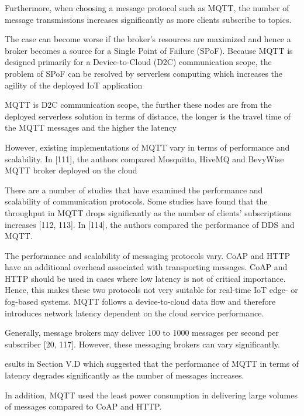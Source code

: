 Furthermore, when choosing a message protocol such as
MQTT, the number of message transmissions increases
significantly as more clients subscribe to topics.
\cite[19]{protocols}

The case
can become worse if the broker’s resources are maximized
and hence a broker becomes a source for a Single Point of
Failure (SPoF). Because MQTT is designed primarily for a
Device-to-Cloud (D2C) communication scope, the problem
of SPoF can be resolved by serverless computing which
increases the agility of the deployed IoT application
\cite[19]{protocols}


MQTT is D2C communication scope, the
further these nodes are from the deployed serverless solution
in terms of distance, the longer is the travel time of the MQTT
messages and the higher the latency \cite[20]{protocols}

However, existing implementations of MQTT vary in
terms of performance and scalability. In [111], the authors
compared Mosquitto, HiveMQ and BevyWise MQTT broker
deployed on the cloud
\cite[20]{protocols}

There are a number of studies that have examined the
performance and scalability of communication protocols.
Some studies have found that the throughput in MQTT drops
significantly as the number of clients’ subscriptions increases
[112, 113]. In [114], the authors compared the performance
of DDS and MQTT. \cite[21]{protocols}

The performance and scalability of messaging protocols
vary. CoAP and HTTP have an additional overhead
associated with transporting messages. CoAP and HTTP
should be used in cases where low latency is not of critical
importance. Hence, this makes these two protocols not very
suitable for real-time IoT edge- or fog-based systems. MQTT
follows a device-to-cloud data flow and therefore introduces
network latency dependent on the cloud service performance.
\cite[21]{protocols}

Generally, message brokers may deliver 100 to 1000
messages per second per subscriber [20, 117]. However, these
messaging brokers can vary significantly.

esults in Section V.D which
suggested that the performance of MQTT in terms of latency
degrades significantly as the number of messages increases. 
\cite[22]{protocols}

In addition, MQTT used
the least power consumption in delivering large volumes of
messages compared to CoAP and HTTP. \cite[22]{protocols}

